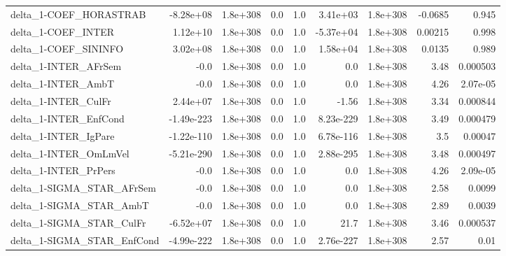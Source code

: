 \begin{tabular}{lrrrrrrrr}
delta\_1-COEF\_HORASTRAB                &   -8.28e+08 &     1.8e+308 &        0.0 &      1.0 &   3.41e+03 &    1.8e+308 &      -0.0685 &         0.945 \\
delta\_1-COEF\_INTER                    &    1.12e+10 &     1.8e+308 &        0.0 &      1.0 &  -5.37e+04 &    1.8e+308 &      0.00215 &         0.998 \\
delta\_1-COEF\_SININFO                  &    3.02e+08 &     1.8e+308 &        0.0 &      1.0 &   1.58e+04 &    1.8e+308 &       0.0135 &         0.989 \\
delta\_1-INTER\_AFrSem                  &        -0.0 &     1.8e+308 &        0.0 &      1.0 &        0.0 &    1.8e+308 &         3.48 &      0.000503 \\
delta\_1-INTER\_AmbT                    &        -0.0 &     1.8e+308 &        0.0 &      1.0 &        0.0 &    1.8e+308 &         4.26 &      2.07e-05 \\
delta\_1-INTER\_CulFr                   &    2.44e+07 &     1.8e+308 &        0.0 &      1.0 &      -1.56 &    1.8e+308 &         3.34 &      0.000844 \\
delta\_1-INTER\_EnfCond                 &  -1.49e-223 &     1.8e+308 &        0.0 &      1.0 &  8.23e-229 &    1.8e+308 &         3.49 &      0.000479 \\
delta\_1-INTER\_IgPare                  &  -1.22e-110 &     1.8e+308 &        0.0 &      1.0 &  6.78e-116 &    1.8e+308 &          3.5 &       0.00047 \\
delta\_1-INTER\_OmLmVel                 &  -5.21e-290 &     1.8e+308 &        0.0 &      1.0 &  2.88e-295 &    1.8e+308 &         3.48 &      0.000497 \\
delta\_1-INTER\_PrPers                  &        -0.0 &     1.8e+308 &        0.0 &      1.0 &        0.0 &    1.8e+308 &         4.26 &      2.09e-05 \\
delta\_1-SIGMA\_STAR\_AFrSem             &        -0.0 &     1.8e+308 &        0.0 &      1.0 &        0.0 &    1.8e+308 &         2.58 &        0.0099 \\
delta\_1-SIGMA\_STAR\_AmbT               &        -0.0 &     1.8e+308 &        0.0 &      1.0 &        0.0 &    1.8e+308 &         2.89 &        0.0039 \\
delta\_1-SIGMA\_STAR\_CulFr              &   -6.52e+07 &     1.8e+308 &        0.0 &      1.0 &       21.7 &    1.8e+308 &         3.46 &      0.000537 \\
delta\_1-SIGMA\_STAR\_EnfCond            &  -4.99e-222 &     1.8e+308 &        0.0 &      1.0 &  2.76e-227 &    1.8e+308 &         2.57 &          0.01 \\

\end{tabular}

